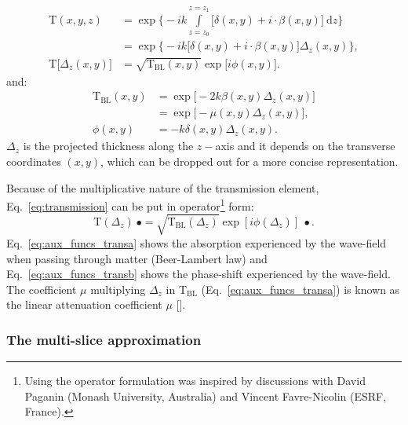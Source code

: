 \begin{refsection}
\begin{align}\label{eq:transmission}
\mathrm{T}(x,y,z) &=\exp\Bigg\{-ik\int\limits_{z=z_0}^{z=z_1}{\big[\delta(x,y)+i\cdot\beta(x,y)\big]~\mathrm{d}z}\Bigg\}\nonumber\\
         &=\exp\Bigg\{-ik\big[\delta(x,y)+i\cdot\beta(x,y)\big]\Delta_z(x,y)\Bigg\},\nonumber\\
\mathrm{T}\big[\Delta_z(x,y)] &=\sqrt{\mathrm{T}_\text{BL}(x,y)}\exp{\big[i\phi(x,y)\big]}.
\end{align}{}
and:
\begin{subequations}
\begin{align}   
    \mathrm{T}_{\text{BL}}(x,y)&=\exp{\big[-2k\beta(x,y)\Delta_z(x,y)\big]}\label{eq:aux_funcs_transa}  \\
    &=\exp{\big[-\mu(x,y)\Delta_z(x,y)\big]},\nonumber\\
    \phi(x,y)&=-k\delta(x,y)\Delta_z(x,y).\label{eq:aux_funcs_transb}
\end{align}
\end{subequations}
$\Delta_z$ is the projected thickness along the $z-$axis and it depends on the transverse coordinates $(x,y)$, which can be dropped out for a more concise representation.

Because of the multiplicative nature of the transmission element, Eq.~\ref{eq:transmission} can be put in operator\footnote{Using the operator formulation was inspired by discussions with David Paganin (Monash University, Australia) and Vincent Favre-Nicolin (ESRF, France).} form:
\begin{equation}\label{eq:transmission_operator}
    \mathrm{T}(\Delta_z)~\bullet =\sqrt{\mathrm{T}_\text{BL}(\Delta_z)}\exp{[i\phi(\Delta_z)]}~\bullet.
\end{equation}
Eq.~\ref{eq:aux_funcs_transa} shows the absorption experienced by the wave-field when passing through matter (Beer-Lambert law) and Eq.~\ref{eq:aux_funcs_transb} shows the phase-shift experienced by the wave-field. The coefficient $\mu$ multiplying $\Delta_z$ in $\mathrm{T}_{\text{BL}}$ (Eq.~\ref{eq:aux_funcs_transa}) is known as the linear attenuation coefficient $\mu$ [\cite[\textit{§1.6}]{Als-Nielsen2011}]. 

\subsubsection*{The multi-slice approximation}


\end{refsection}
